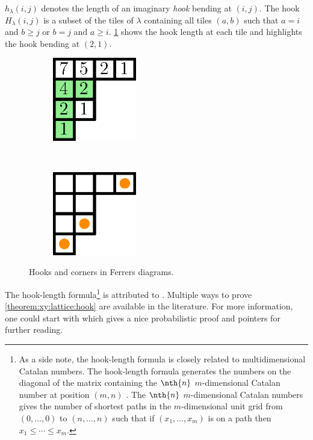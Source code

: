 \(h_{\lambda}(i,j)\) denotes the length of an imaginary \emph{hook} bending at
\((i,j)\). The hook \(H_{\lambda}(i,j)\) is a subset of the tiles of
\(\lambda\) containing all tiles \((a,b)\) such that \(a = i\) and \(b \ge j\)
or \(b = j\) and \(a \ge i\). \ref{fig:xy:lattice:hooks} shows the hook length
at each tile and highlights the hook bending at \((2,1)\).

\begin{figure}
\centering
\begin{subfigure}[t]{0.47\textwidth}
\centering
	\includegraphics[width=0.4\textwidth]{fig/x+y/lattice/hooks}
	\label{fig:xy:lattice:hooks}
\end{subfigure}
~
\begin{subfigure}[t]{0.47\textwidth}
\centering
	\includegraphics[width=0.4\textwidth]{fig/x+y/lattice/corners}
	\label{fig:xy:lattice:corners}
\end{subfigure}
\caption{Hooks and corners in Ferrers diagrams.}
\end{figure}

The hook-length formula\footnote{
As a side note, the hook-length formula is closely related to
multidimensional Catalan numbers. The hook-length formula generates the numbers
on the diagonal of the matrix containing the \(\nth{n}\) \(m\)-dimensional
Catalan number at position \((m,n)\) \cite{OEIS:A060854}. The \(\nth{n}\)
\(m\)-dimensional Catalan numbers gives the number of shortest paths in the
\(m\)-dimensional unit grid from \( (0,\ldots,0) \) to \( (n,\ldots,n) \) such
that if \( (x_1,\ldots,x_m) \) is on a path then \( x_1 \le \cdots \le x_m\).
}
is attributed to \citet*{frame:1954}. Multiple ways to
prove \ref{theorem:xy:lattice:hook} are available in the literature. For more
information, one could start with \citet*{greene:1979} which gives a nice
probabilistic proof and pointers for further reading.

